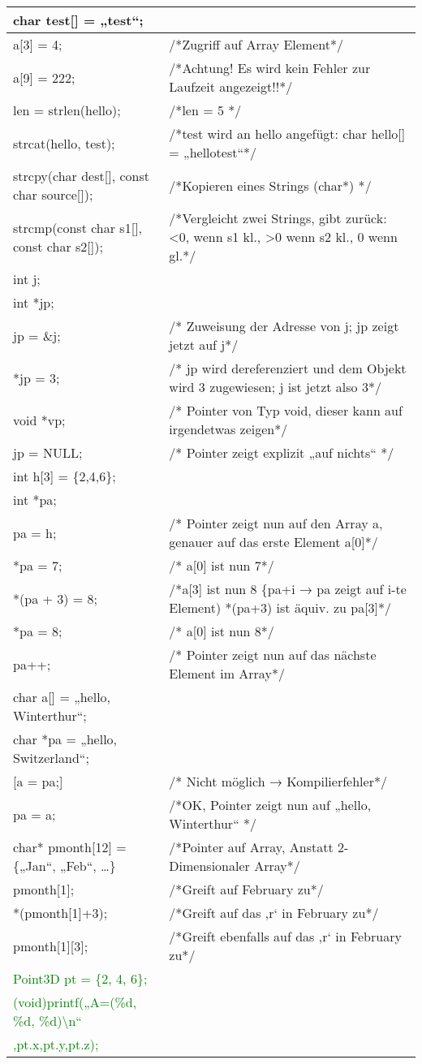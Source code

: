 \begin{tabular}{|l|l|}
\hline 
char test{[}{]} = „test“; & \tabularnewline
\hline 
a{[}3{]} = 4; & /{*}Zugriff auf Array Element{*}/\tabularnewline
\hline 
a{[}9{]} = 222;  & /{*}Achtung! Es wird kein Fehler zur Laufzeit angezeigt!!{*}/\tabularnewline
\hline 
len = strlen(hello);  & /{*}len = 5 {*}/\tabularnewline
\hline 
strcat(hello, test); & /{*}test wird an hello angefügt: char hello{[}{]} = „hellotest“{*}/\tabularnewline
\hline 
strcpy(char dest{[}{]}, const char source{[}{]}); & /{*}Kopieren eines Strings (char{*}) {*}/\tabularnewline
\hline 
strcmp(const char s1{[}{]}, const char s2{[}{]}); & /{*}Vergleicht zwei Strings, gibt zurück: <0, wenn s1 kl., >0 wenn
s2 kl., 0 wenn gl.{*}/\tabularnewline
\hline 
\hline 
int j; & \tabularnewline
\hline 
int {*}jp; & \tabularnewline
\hline 
jp = \&j; & /{*} Zuweisung der Adresse von j; jp zeigt jetzt auf j{*}/\tabularnewline
\hline 
{*}jp = 3; & /{*} jp wird dereferenziert und dem Objekt wird 3 zugewiesen; j ist
jetzt also 3{*}/\tabularnewline
\hline 
void {*}vp; & /{*} Pointer von Typ void, dieser kann auf irgendetwas zeigen{*}/\tabularnewline
\hline 
jp = NULL;  & /{*} Pointer zeigt explizit „auf nichts“ {*}/\tabularnewline
\hline 
int h{[}3{]} = \{2,4,6\}; & \tabularnewline
\hline 
int {*}pa; & \tabularnewline
\hline 
pa = h; & /{*} Pointer zeigt nun auf den Array a, genauer auf das erste Element
a{[}0{]}{*}/\tabularnewline
\hline 
{*}pa = 7; & /{*} a{[}0{]} ist nun 7{*}/\tabularnewline
\hline 
{*}(pa + 3) = 8; & /{*}a{[}3{]} ist nun 8 \{pa+i → pa zeigt auf i-te Element) {*}(pa+3)
ist äquiv. zu pa{[}3{]}{*}/\tabularnewline
\hline 
{*}pa = 8; & /{*} a{[}0{]} ist nun 8{*}/\tabularnewline
\hline 
pa++; & /{*} Pointer zeigt nun auf das nächste Element im Array{*}/\tabularnewline
\hline 
char a{[}{]} = „hello, Winterthur“; & \tabularnewline
\hline 
char {*}pa = „hello, Switzerland“; & \tabularnewline
\hline 
{[}a = pa;{]} & /{*} Nicht möglich → Kompilierfehler{*}/\tabularnewline
\hline 
pa = a; & /{*}OK, Pointer zeigt nun auf „hello, Winterthur“ {*}/\tabularnewline
\hline 
char{*} pmonth{[}12{]} = \{„Jan“, „Feb“, …\} & /{*}Pointer auf Array, Anstatt 2-Dimensionaler Array{*}/\tabularnewline
\hline 
pmonth{[}1{]}; & /{*}Greift auf February zu{*}/\tabularnewline
\hline 
{*}(pmonth{[}1{]}+3); & /{*}Greift auf das ‚r‘ in February zu{*}/\tabularnewline
\hline 
pmonth{[}1{]}{[}3{]}; & /{*}Greift ebenfalls auf das ‚r‘ in February zu{*}/\tabularnewline
\hline 
\hline 
\textcolor{green}{Point3D pt = \{2, 4, 6\};} & \tabularnewline
\hline 
\textcolor{green}{(void)printf(„A=(\%d, \%d, \%d)\textbackslash{}n“} & \tabularnewline
\textcolor{green}{,pt.x,pt.y,pt.z);} & \tabularnewline
\hline 
\end{tabular}

